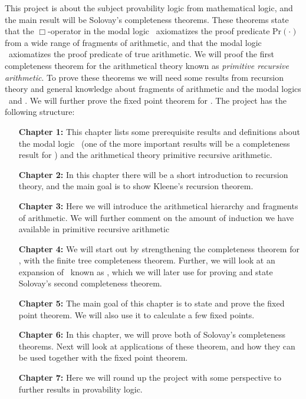 \documentclass[../main.tex]{subfiles}
\begin{document}
This project is about the subject provability logic from mathematical logic,
and the main result will be Solovay's completeness theorems. These theorems
state that the $\Box$-operator in the  modal logic \GL\  axiomatizes the proof
predicate $\text{Pr}(\cdot)$ from a wide range of fragments of arithmetic, and
that the modal logic \GLS\ axiomatizes the proof predicate of true arithmetic.
We will proof the first completeness theorem for the arithmetical theory known
as \textit{primitive recursive arithmetic}.
To prove these theorems we will need some results from recursion theory and
general knowledge about fragments of arithmetic and the modal logics \GL\ and
\GLS. We will further prove the fixed point theorem for \GL.
The project has the following structure: 
\begin{enumerate}
	\item[\textbf{Chapter 1:}] This chapter lists some prerequisite results and
		definitions about the modal logic \GL\ (one of the more
		important results will be a completeness result for \GL)  and the arithmetical
		theory  primitive
		recursive arithmetic. 
	\item[\textbf{Chapter 2:}] In this chapter there will be a short introduction to recursion
		theory, and the main goal is to show Kleene's recursion theorem.
	\item[\textbf{Chapter 3:}] Here we will introduce the arithmetical hierarchy and
		fragments of arithmetic. We will further comment on the amount
		of induction we have available in primitive recursive
		arithmetic
	\item[\textbf{Chapter 4:}] We will start out by strengthening the completeness
		theorem for \GL, with the finite tree completeness theorem.
		Further, we will look at an expansion of \GL\ known as \GLS,
		which we will later use  for proving and state Solovay's second completeness
		theorem.
	\item[\textbf{Chapter 5:}] The main goal of this chapter is to state and prove
		the fixed point theorem. We will also use it to calculate a few fixed
		points.
	\item[\textbf{Chapter 6:}] In this chapter, we will prove both of Solovay's
		completeness theorems. Next will look
		at applications of these theorem, and how they can be used
		together with the fixed point theorem.
	\item[\textbf{Chapter 7:}] Here we will round up the project with some
		perspective to further results in provability logic.
\end{enumerate}
\end{document}
